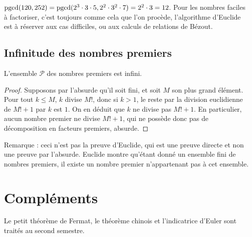 \begin{exemple}
$\operatorname{pgcd}(120,252)=\operatorname{pgcd}(2^3\cdot 3\cdot 5,2^2\cdot 3^2\cdot 7) =2^2\cdot 3=12$.
Pour les nombres faciles à factoriser, c'est toujours comme cela que l'on procède, l'algorithme d'Euclide est à réserver aux cas difficiles, ou aux calculs de relations de Bézout.
\end{exemple}


\subsection{Infinitude des nombres premiers}

\begin{proposition}
L'ensemble $\mathcal P$ des nombres premiers est infini.
\end{proposition}
\begin{proof}
Supposons par l'absurde qu'il soit fini, et soit $M$ son plus grand élément. Pour tout $k\leq M$, $k$ divise $M!$, donc si $k>1$, le reste par la division euclidienne de $M!+1$ par $k$ est $1$. On en déduit que $k$ ne divise pas $M!+1$. En particulier, aucun nombre premier ne divise $M!+1$, qui ne possède donc pas de décomposition en facteurs premiers, absurde.
\end{proof}

Remarque : ceci n'est pas la preuve d'Euclide, qui est une preuve directe et non une preuve par l'absurde. Euclide montre qu'étant donné un ensemble fini de nombres premiers, il existe un nombre premier n'appartenant pas à cet ensemble.

\section{Compléments}

Le petit théorème de Fermat, le théorème chinois et l'indicatrice d'Euler sont traités au second semestre.